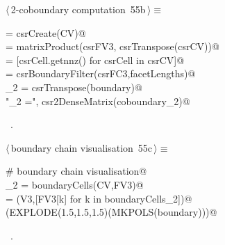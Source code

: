 \documentclass[11pt,oneside]{article}	%
\begin{document}
\begin{flushleft} \small \label{scrap96}
\protect{}$\langle\,$2-coboundary computation\nobreak\ {\footnotesize 55b}$\,\rangle\equiv$
\vspace{-1ex}
\begin{list}{}{} \item
\mbox{}\verb@csrCV = csrCreate(CV)@\\
\mbox{} = matrixProduct(csrFV3, csrTranspose(csrCV))@\\
\mbox{}\verb@facetLengths = [csrCell.getnnz() for csrCell in csrCV]@\\
\mbox{}\verb@boundary = csrBoundaryFilter(csrFC3,facetLengths)@\\
\mbox{}\verb@coboundary_2 = csrTranspose(boundary)@\\
\mbox{}\verb@print "\ncoboundary_2 =\n", csr2DenseMatrix(coboundary_2)@\\
\mbox{}\verb@@{\NWsep}
\end{list}
\vspace{-1ex}
\footnotesize\addtolength{\baselineskip}{-1ex}
\begin{list}{}{\setlength{\itemsep}{-\parsep}\setlength{\itemindent}{-\leftmargin}}
\item \NWtxtMacroRefIn\ .
\end{list}
\end{flushleft}

\begin{flushleft} \small \label{scrap97}
\protect{}$\langle\,$boundary chain visualisation\nobreak\ {\footnotesize 55c}$\,\rangle\equiv$
\vspace{-1ex}
\begin{list}{}{} \item
\mbox{}\verb@# boundary chain visualisation@\\
\mbox{}\verb@boundaryCells_2 = boundaryCells(CV,FV3)@\\
\mbox{}\verb@boundary = (V3,[FV3[k] for k in boundaryCells_2])@\\
\mbox{}\verb@VIEW(EXPLODE(1.5,1.5,1.5)(MKPOLS(boundary)))@\\
\mbox{}\verb@@{\NWsep}
\end{list}
\vspace{-1ex}
\footnotesize\addtolength{\baselineskip}{-1ex}
\begin{list}{}{\setlength{\itemsep}{-\parsep}\setlength{\itemindent}{-\leftmargin}}
\item \NWtxtMacroRefIn\ .
\end{list}
\end{flushleft}
\end{document}
